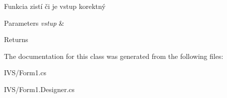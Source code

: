 Funkcia zistí či je vstup korektný 


\begin{DoxyParams}{Parameters}
{\em vstup} & \\
\hline
\end{DoxyParams}
\begin{DoxyReturn}{Returns}

\end{DoxyReturn}


The documentation for this class was generated from the following files\+:\begin{DoxyCompactItemize}
\item 
I\+V\+S/Form1.\+cs\item 
I\+V\+S/Form1.\+Designer.\+cs\end{DoxyCompactItemize}
